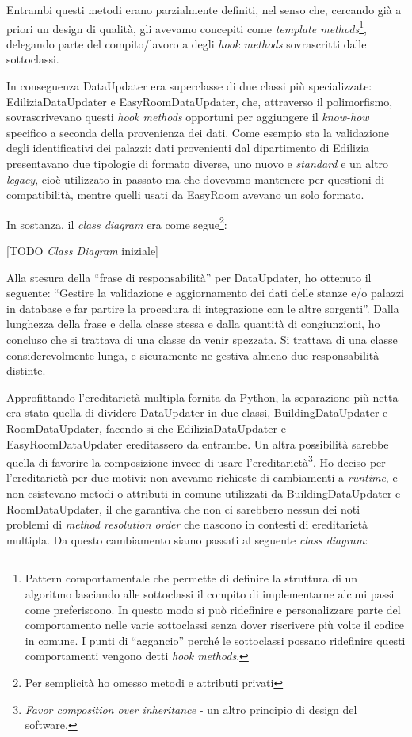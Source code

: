 \documentclass[12pt]{report}
\begin{document}
Entrambi questi metodi erano parzialmente definiti, nel senso che, cercando già
a priori un design di qualità, gli avevamo concepiti come
\textit{template methods}\footnote{
Pattern comportamentale che permette di 
definire la struttura di un algoritmo lasciando alle sottoclassi il compito di 
implementarne alcuni passi come preferiscono. In questo modo si può ridefinire 
e personalizzare parte del comportamento nelle varie sottoclassi senza dover 
riscrivere più volte il codice in comune. I punti di ``aggancio'' perché le 
sottoclassi possano ridefinire questi comportamenti vengono detti 
\textit{hook methods}.
},
delegando parte del compito/lavoro a degli \textit{hook methods} sovrascritti
dalle sottoclassi.

In conseguenza DataUpdater era superclasse di due classi più specializzate: 
EdiliziaDataUpdater e EasyRoomDataUpdater, che, attraverso il polimorfismo,
sovrascrivevano questi \textit{hook methods} opportuni per aggiungere 
il \textit{know-how} specifico a seconda della provenienza dei dati. 
Come esempio sta la validazione degli identificativi dei palazzi: 
dati provenienti dal dipartimento di Edilizia presentavano due
tipologie di formato diverse, uno nuovo e \textit{standard} e un altro 
\textit{legacy}, cioè utilizzato in passato ma che dovevamo mantenere per
questioni di compatibilità, mentre quelli usati da EasyRoom avevano un solo formato.

In sostanza, il \textit{class diagram} era come segue\footnote{Per 
semplicità ho omesso metodi e attributi privati}:

[TODO \textit{Class Diagram} iniziale]

Alla stesura della ``frase di responsabilità'' per DataUpdater, ho
ottenuto il seguente: 
``Gestire la validazione e aggiornamento dei dati delle stanze 
e/o palazzi in database e far partire la procedura di integrazione
con le altre sorgenti''. 
Dalla lunghezza della frase e della classe stessa e dalla quantità di 
congiunzioni, ho concluso che si trattava di una classe da venir 
spezzata. Si trattava di una classe considerevolmente lunga, 
e sicuramente ne gestiva almeno due responsabilità distinte.

Approfittando l'ereditarietà multipla fornita da Python, la separazione più netta
era stata quella di dividere DataUpdater in due classi, 
BuildingDataUpdater e RoomDataUpdater, facendo si che EdiliziaDataUpdater 
e EasyRoomDataUpdater ereditassero da entrambe. Un altra possibilità 
sarebbe quella di favorire la composizione invece di usare l'ereditarietà\footnote{
\textit{Favor composition over inheritance} - un altro principio di
design del software.
}. 
Ho deciso per l'ereditarietà per due motivi: non avevamo richieste di 
cambiamenti a \textit{runtime}, e non esistevano metodi o attributi 
in comune utilizzati da BuildingDataUpdater e RoomDataUpdater, il che garantiva 
che non ci sarebbero nessun dei noti problemi di \textit{method resolution 
order} che nascono in contesti di ereditarietà multipla. Da questo cambiamento
siamo passati al seguente \textit{class diagram}:
\end{document}
